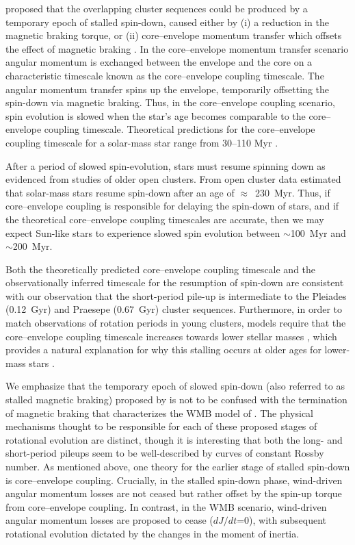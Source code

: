 \documentclass[linenumbers,trackchanges,twocolumn]{aastex631}
\begin{document}
\citet{Curtis2019a, Curtis2020} proposed that the overlapping cluster sequences could be produced by a temporary epoch of stalled spin-down, caused either by (i) a reduction in the magnetic braking torque, or (ii) core–envelope momentum transfer which offsets the effect of magnetic braking \citep[e.g.][]{MacGregor1991}. In the core–envelope momentum transfer scenario angular momentum is exchanged between the envelope and the core on a characteristic timescale known as the core–envelope coupling timescale. The angular momentum transfer spins up the envelope, temporarily offsetting the spin-down via magnetic braking. Thus, in the core–envelope coupling scenario, spin evolution is slowed when the star's age becomes comparable to the core–envelope coupling timescale. Theoretical predictions for the core–envelope coupling timescale for a solar-mass star range from 30--110 Myr \citep{MacGregor1991,Krishnamurthi1997, Bouvier2008, IrwinBouvier2009, Denissenkov2010, GalletBouvier2015, Lanzafame2015, Somers2016, Spada2020}. 

After a period of slowed spin-evolution, stars must resume spinning down as evidenced from studies of older open clusters. From open cluster data \citet{Curtis2020} estimated that solar-mass stars resume spin-down after an age of $\approx$~230~Myr. Thus, if core–envelope coupling is responsible for delaying the spin-down of stars, and if the theoretical core–envelope coupling timescales are accurate, then we may expect Sun-like stars to experience slowed spin evolution between $\sim$100~Myr and $\sim$200~Myr. 

Both the theoretically predicted core–envelope coupling timescale and the observationally inferred timescale for the resumption of spin-down are consistent with our observation that the short-period pile-up is intermediate to the Pleiades (0.12~Gyr) and Praesepe (0.67~Gyr) cluster sequences. Furthermore, in order to match observations of rotation periods in young clusters, models require that the core–envelope coupling timescale increases towards lower stellar masses \citep[e.g.][]{Irwin2007, Denissenkov2010, GalletBouvier2015}, which provides a natural explanation for why this stalling occurs at older ages for lower-mass stars \citep{Curtis2020}. 

We emphasize that the temporary epoch of slowed spin-down (also referred to as stalled magnetic braking) proposed by \citet{Curtis2019a, Curtis2020} is not to be confused with the termination of magnetic braking that characterizes the WMB model of \citet{vanSaders2016, vanSaders2019}. The physical mechanisms thought to be responsible for each of these proposed stages of rotational evolution are distinct, though it is interesting that both the long- and short-period pileups seem to be well-described by curves of constant Rossby number. As mentioned above, one theory for the earlier stage of stalled spin-down is core–envelope coupling. Crucially, in the stalled spin-down phase, wind-driven angular momentum losses are not ceased but rather offset by the spin-up torque from core–envelope coupling. In contrast, in the WMB scenario, wind-driven angular momentum losses are proposed to cease ($dJ/dt$=0), with subsequent rotational evolution dictated by the changes in the moment of inertia. 
\end{document}
